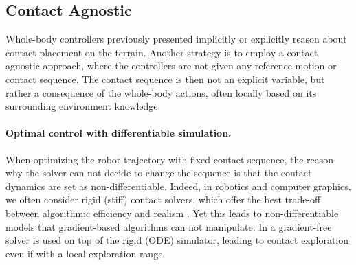 \subsection{Contact Agnostic}
Whole-body controllers previously presented implicitly or explicitly reason about contact placement on the terrain.
Another strategy is to employ a contact agnostic approach, where the controllers are not given any reference motion or contact sequence.
The contact sequence is then not an explicit variable, but rather a consequence of the whole-body actions, often locally based on its surrounding environment knowledge.




\paragraph{Optimal control with differentiable simulation.}

When optimizing the robot trajectory with fixed contact sequence, the reason why the solver can not decide to change the sequence is that the contact dynamics are set as non-differentiable. 
Indeed, in robotics and computer graphics, we often consider rigid (stiff) contact solvers, which offer the best trade-off between algorithmic efficiency and realism \cite{pybullet_coumans2019}.
Yet this leads to non-differentiable models that gradient-based algorithms can not manipulate. 
In \cite{hamalainen_2015} a gradient-free solver is used on top of the rigid (ODE) simulator, leading to contact exploration even if with a local exploration range.

